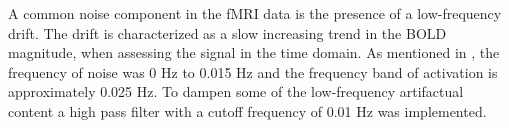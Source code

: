 A common noise component in the fMRI data is the presence of a low-frequency drift. The drift is characterized as a slow increasing trend in the BOLD magnitude, when assessing the signal in the time domain. As mentioned in , the frequency of noise was 0 Hz to 0.015 Hz and the frequency band of activation is approximately 0.025 Hz. To dampen some of the low-frequency artifactual content a high pass filter with a cutoff frequency of 0.01 Hz was implemented. \cite{FMRIB2018} \\


 
 
 
 
 
